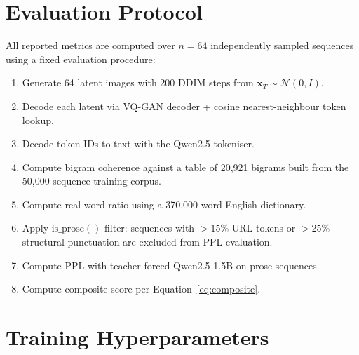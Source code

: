 \documentclass[11pt,a4paper]{article}
\begin{document}
\section{Evaluation Protocol}
\label{app:eval}

All reported metrics are computed over $n=64$ independently sampled sequences
using a fixed evaluation procedure:
\begin{enumerate}[leftmargin=1.5em]
  \item Generate 64 latent images with 200 DDIM steps from $\mathbf{x}_T \sim \mathcal{N}(0,I)$.
  \item Decode each latent via VQ-GAN decoder + cosine nearest-neighbour token lookup.
  \item Decode token IDs to text with the Qwen2.5 tokeniser.
  \item Compute bigram coherence against a table of 20{,}921 bigrams built from the
    50{,}000-sequence training corpus.
  \item Compute real-word ratio using a 370{,}000-word English dictionary.
  \item Apply $\text{is\_prose}()$ filter: sequences with $>15$\% URL tokens or
    $>25$\% structural punctuation are excluded from PPL evaluation.
  \item Compute PPL with teacher-forced Qwen2.5-1.5B on prose sequences.
  \item Compute composite score per Equation~\ref{eq:composite}.
\end{enumerate}

\section{Training Hyperparameters}
\label{app:hparams}
\end{document}
